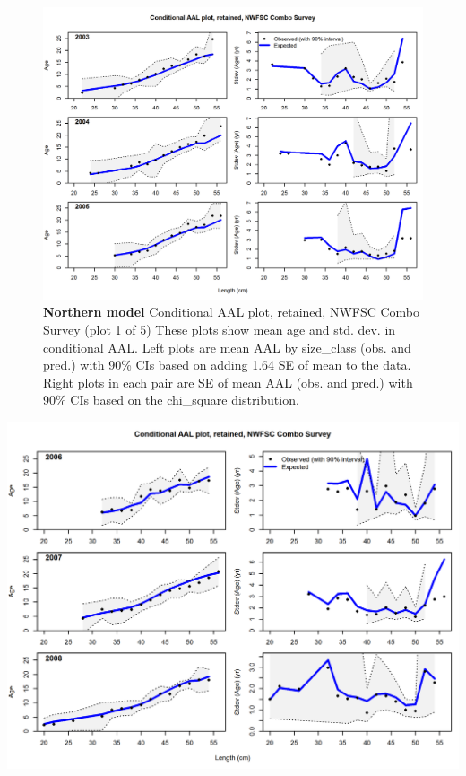 \documentclass[12pt,]{article}
\begin{document}
\begin{figure}[htbp]
\centering
\includegraphics{./r4ss/plots_mod1/comp_condAALfit_Andre_plotsflt6mkt2_page1.png}
\caption{\textbf{Northern model} Conditional AAL plot, retained, NWFSC
Combo Survey (plot 1 of 5) These plots show mean age and std. dev. in
conditional AAL. Left plots are mean AAL by size\_class (obs. and pred.)
with 90\% CIs based on adding 1.64 SE of mean to the data. Right plots
in each pair are SE of mean AAL (obs. and pred.) with 90\% CIs based on
the chi\_square distribution.
\label{fig:mod1_4_comp_condAALfit_Andre_plotsflt6mkt2_page1}}
\end{figure}

\includegraphics{./r4ss/plots_mod1/comp_condAALfit_Andre_plotsflt6mkt2_page2.png}
\end{document}
